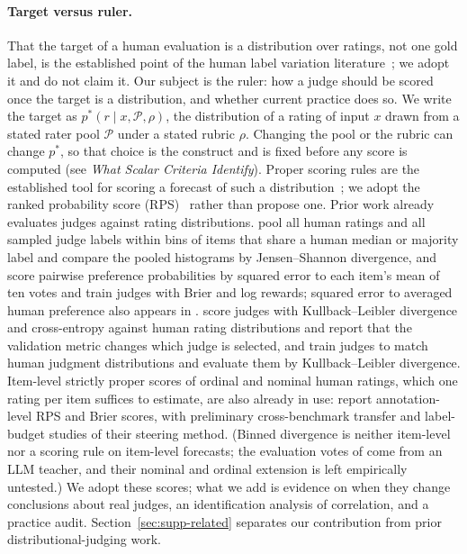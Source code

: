 \paragraph{Target versus ruler.}
That the target of a human evaluation is a distribution over ratings, not one gold label, is the established point of the human label variation literature~\citep{pavlick2019inherent,plank2022problem}; we adopt it and do not claim it.
Our subject is the ruler: how a judge should be scored once the target is a distribution, and whether current practice does so.
We write the target as $p^*(r\mid x,\mathcal{P},\rho)$, the distribution of a rating of input $x$ drawn from a stated rater pool $\mathcal{P}$ under a stated rubric $\rho$.
Changing the pool or the rubric can change $p^*$, so that choice is the construct and is fixed before any score is computed (see \emph{What Scalar Criteria Identify}).
Proper scoring rules are the established tool for scoring a forecast of such a distribution~\citep{gneiting2007strictly}; we adopt the ranked probability score (RPS)~\citep{epstein1969scoring} rather than propose one.
Prior work already evaluates judges against rating distributions. \citet{elangovan2025beyond} pool all human ratings and all sampled judge labels within bins of items that share a human median or majority label and compare the pooled histograms by Jensen--Shannon divergence, and \citet{li2026judging} score pairwise preference probabilities by squared error to each item's mean of ten votes and train judges with Brier and log rewards; squared error to averaged human preference also appears in \citet{wang2025improving}. \citet{guerdan2025validating} score judges with Kullback--Leibler divergence and cross-entropy against human rating distributions and report that the validation metric changes which judge is selected, and \citet{chen2025beyond} train judges to match human judgment distributions and evaluate them by Kullback--Leibler divergence.
Item-level strictly proper scores of ordinal and nominal human ratings, which one rating per item suffices to estimate, are also already in use: \citet{lyu2026humanresidual} report annotation-level RPS and Brier scores, with preliminary cross-benchmark transfer and label-budget studies of their steering method. (Binned divergence is neither item-level nor a scoring rule on item-level forecasts; the evaluation votes of \citeauthor{li2026judging} come from an LLM teacher, and their nominal and ordinal extension is left empirically untested.) We adopt these scores; what we add is evidence on when they change conclusions about real judges, an identification analysis of correlation, and a practice audit.
\ifsupplementary Section~\ref{sec:supp-related} separates our contribution from prior distributional-judging work.\fi

